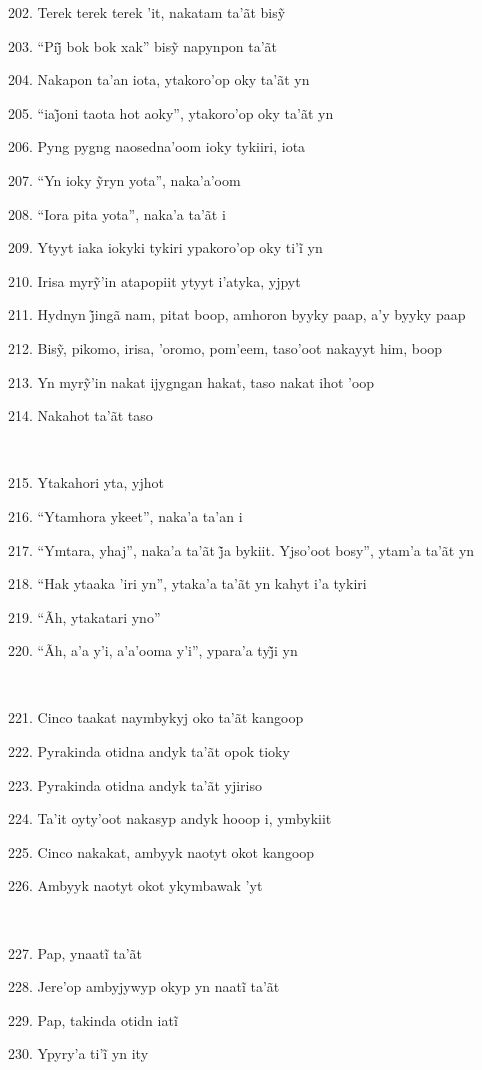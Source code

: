 202. Terek terek terek ’it, nakatam ta’ãt bisỹ

203. ``Pij̃ bok bok xak'' bisỹ napynpon ta’ãt

204. Nakapon ta'an iota, ytakoro'op oky ta'ãt yn

205. ``iaj̃oni taota hot aoky'', ytakoro’op oky ta’ãt yn

206. Pyng pygng naosedna'oom ioky tykiiri, iota

207. ``Yn ioky ỹryn yota'', naka’a’oom

208. ``Iora pita yota'', naka'a ta'ãt i

209. Ytyyt iaka iokyki tykiri ypakoro’op oky ti’ĩ yn

210. Irisa myrỹ’in atapopiit ytyyt i’atyka, yjpyt

211. Hydnyn j̃ingã nam, pitat boop, amhoron byyky paap, a’y byyky paap

212. Bisỹ, pikomo, irisa, ’oromo, pom’eem, taso’oot nakayyt him, boop

213. Yn myrỹ’in nakat ijygngan hakat, taso nakat ihot ’oop

214. Nakahot ta'ãt taso

~

215. Ytakahori yta, yjhot

216. ``Ytamhora ykeet'', naka'a ta'an i

217. ``Ymtara, yhaj'', naka’a ta’ãt j̃a bykiit. Yjso’oot bosy'', ytam’a ta’ãt yn

218. ``Hak ytaaka 'iri yn'', ytaka'a ta'ãt yn kahyt i'a tykiri

219. ``Ãh, ytakatari yno''

220. ``Ãh, a’a y’i, a’a’ooma y’i'', ypara’a tyj̃i yn

~

221. Cinco taakat naymbykyj oko ta'ãt kangoop

222. Pyrakinda otidna andyk ta'ãt opok tioky

223. Pyrakinda otidna andyk ta'ãt yjiriso

224. Ta'it oyty'oot nakasyp andyk hooop i, ymbykiit

225. Cinco nakakat, ambyyk naotyt okot kangoop

226. Ambyyk naotyt okot ykymbawak 'yt

~

227. Pap, ynaatĩ ta’ãt

228. Jere’op ambyjywyp okyp yn naatĩ ta’ãt

229. Pap, takinda otidn iatĩ

230. Ypyry’a ti’ĩ yn ity

